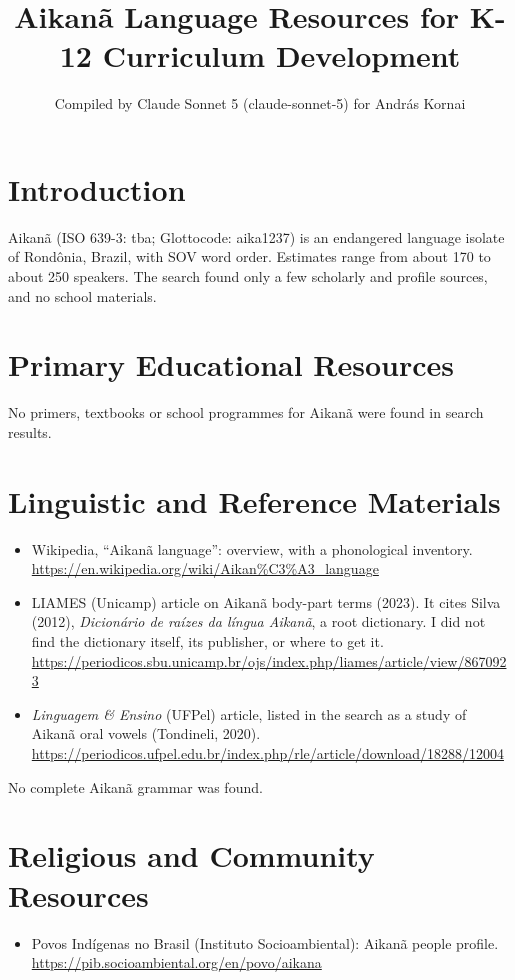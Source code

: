 \documentclass[12pt]{article}
\title{Aikan\~a Language Resources for K-12 Curriculum Development}
\author{Compiled by Claude Sonnet 5 (claude-sonnet-5) for Andr\'as Kornai}
\date{}
\begin{document}
\maketitle

\section{Introduction}
Aikan\~a (ISO 639-3: tba; Glottocode: aika1237) is an endangered language isolate of Rond\^onia, Brazil, with SOV word order. Estimates range from about 170 to about 250 speakers. The search found only a few scholarly and profile sources, and no school materials.

\section{Primary Educational Resources}
No primers, textbooks or school programmes for Aikan\~a were found in search results.

\section{Linguistic and Reference Materials}
\begin{itemize}
\item Wikipedia, ``Aikan\~a language'': overview, with a phonological inventory. \url{https://en.wikipedia.org/wiki/Aikan%C3%A3_language}
\item LIAMES (Unicamp) article on Aikan\~a body-part terms (2023). It cites Silva (2012), \emph{Dicion\'ario de ra\'izes da l\'ingua Aikan\~a}, a root dictionary. I did not find the dictionary itself, its publisher, or where to get it. \url{https://periodicos.sbu.unicamp.br/ojs/index.php/liames/article/view/8670923}
\item \emph{Linguagem \& Ensino} (UFPel) article, listed in the search as a study of Aikan\~a oral vowels (Tondineli, 2020). \url{https://periodicos.ufpel.edu.br/index.php/rle/article/download/18288/12004}
\end{itemize}
No complete Aikan\~a grammar was found.

\section{Religious and Community Resources}
\begin{itemize}
\item Povos Ind\'igenas no Brasil (Instituto Socioambiental): Aikan\~a people profile. \url{https://pib.socioambiental.org/en/povo/aikana}
\end{itemize}
\end{document}
